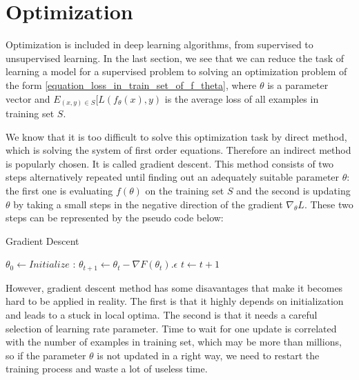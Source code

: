 \section{Optimization}
Optimization is included in deep learning algorithms, from supervised to unsupervised learning. In the last section, we see that we can reduce the task of learning a model for a supervised problem to solving an optimization problem of the form \eqref{equation_loss_in_train_set_of_f_theta}, where $\displaystyle \theta$ is a parameter vector and $\displaystyle E_{(x,y) \in S}[L(f_{\theta}(x), y)$ is the average loss of all examples in training set $\displaystyle S$. 

We know that it is too difficult to solve this optimization task by direct method, which is solving the system of first order equations. Therefore an indirect method is popularly chosen. It is called gradient descent. This method consists of two steps alternatively repeated until finding out an adequately suitable parameter $\displaystyle \theta$: the first one is evaluating $\displaystyle f(\theta)$ on the training set $\displaystyle S$ and the second is updating $\displaystyle \theta$ by taking a small steps in the negative direction of the gradient $\displaystyle \nabla_{\theta}L$. These two steps can be represented by the pseudo code below:
\begin{algorithm}
    \caption{Gradient Descent}
    \begin{algorithmic}[1]
        \State $\theta_0 \gets \textit{Initialize}$
        :
            \State $\theta_{t + 1} \gets \theta_{t} - \nabla F(\theta_{t}) . \epsilon$
            \State $t \gets t + 1$
        \EndFor
    \end{algorithmic}
\end{algorithm}

However, gradient descent method has some disavantages that make it becomes hard to be applied in reality. The first is that it highly depends on initialization and leads to a stuck in local optima. The second is that it needs a careful selection of learning rate parameter. Time to wait for one update is correlated with the number of examples in training set, which may be more than millions, so if the parameter $\displaystyle \theta$ is not updated in a right way, we need to restart the training process and waste a lot of useless time. 


